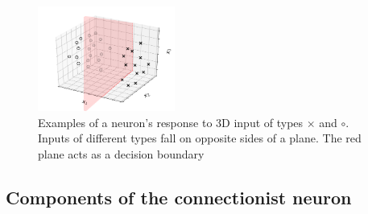 \begin{frame}

\begin{figure}[ht]
     \centering
	\includegraphics[width=0.4\textwidth]{img/neuron_3d_grid}
	\caption{Examples of a neuron's response to 3D input of types $\times$ and $\circ$. Inputs of different types fall on opposite sides of a plane. The red plane acts as a decision boundary}
	\label{fig:neuron_3d_grid} 
\end{figure}
\end{frame}


\subsection{Components of the connectionist neuron}
    
